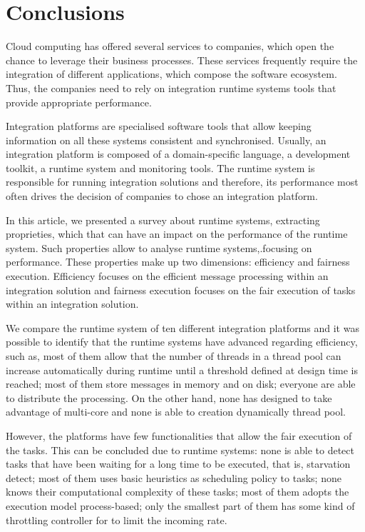 \section{Conclusions}
\label{sec:conclusions}

\noindent
Cloud computing has offered several services to companies, which open the chance to leverage their business processes. These services frequently require the integration of different applications, which compose the software ecosystem. Thus, the companies need to rely on integration runtime systems tools that provide appropriate performance.

Integration platforms are specialised software tools that allow keeping information on all these systems consistent and synchronised. Usually, an integration platform is composed of a domain-specific language, a development toolkit, a runtime system and monitoring tools. The runtime system is responsible for running integration solutions and therefore, its performance most often drives the decision of companies to chose an integration platform.

In this article, we presented a survey about runtime systems, extracting proprieties, which that can have an impact on the performance of the runtime system.  Such properties allow to analyse runtime systems,.focusing on performance. These properties make up two dimensions: efficiency and fairness execution. Efficiency focuses on the efficient message processing within an integration solution and fairness execution focuses on the fair execution of tasks within an integration solution. 

We compare the runtime system of ten different integration platforms and it was possible to identify that the runtime systems have advanced regarding efficiency, such as, most of them allow that the number of threads in a thread pool can increase automatically during runtime until a threshold defined at design time is reached; most of them store messages in memory and on disk; everyone are able to distribute the processing. On the other hand, none has designed to take advantage of multi-core and none is able to creation dynamically thread pool.

However, the platforms have few functionalities that allow the fair execution of the tasks. This can be concluded due to runtime systems: none is able to detect tasks that have been waiting for a long time to be executed, that is, starvation detect; most of them uses basic heuristics as scheduling policy to tasks; none knows their computational complexity of these tasks; most of them adopts the execution model process-based; only the smallest part of them has some kind of throttling controller for to limit the incoming rate.


